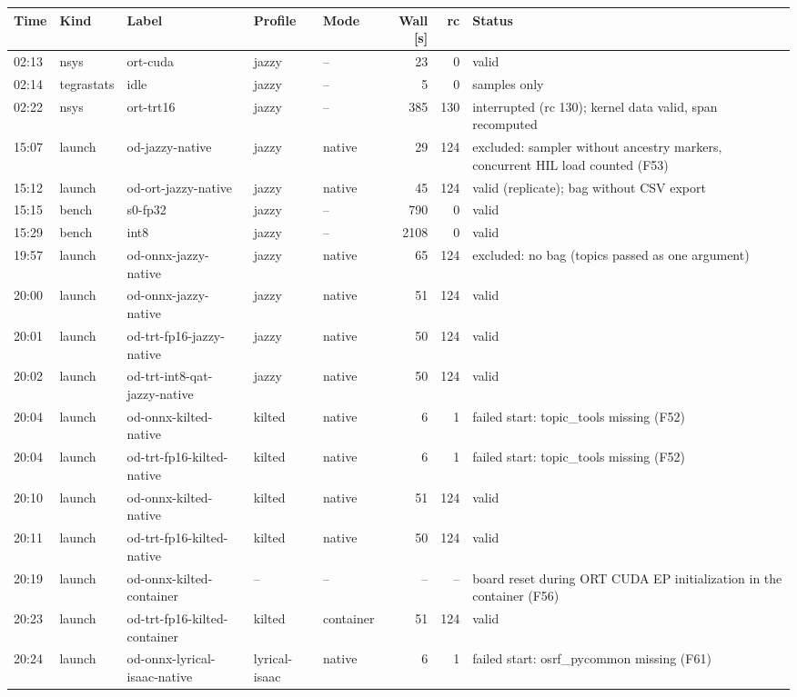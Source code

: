 \begin{longtable}{@{}ll>{\raggedright\arraybackslash}p{3.3cm}llrr>{\raggedright\arraybackslash}p{5.6cm}@{}}
\toprule
Time & Kind & Label & Profile & Mode & Wall [s] & rc & Status \\
\midrule
\endhead
02:13 & nsys & ort-cuda & jazzy & -- & 23 & 0 & valid \\
02:14 & tegrastats & idle & jazzy & -- & 5 & 0 & 3 samples only \\
02:22 & nsys & ort-trt16 & jazzy & -- & 385 & 130 & interrupted (rc 130); kernel data valid, span recomputed \\
15:07 & launch & od-jazzy-native & jazzy & native & 29 & 124 & excluded: sampler without ancestry markers, concurrent HIL load counted (F53) \\
15:12 & launch & od-ort-jazzy-native & jazzy & native & 45 & 124 & valid (replicate); bag without CSV export \\
15:15 & bench & s0-fp32 & jazzy & -- & 790 & 0 & valid \\
15:29 & bench & int8 & jazzy & -- & 2108 & 0 & valid \\
19:57 & launch & od-onnx-jazzy-native & jazzy & native & 65 & 124 & excluded: no bag (topics passed as one argument) \\
20:00 & launch & od-onnx-jazzy-native & jazzy & native & 51 & 124 & valid \\
20:01 & launch & od-trt-fp16-jazzy-native & jazzy & native & 50 & 124 & valid \\
20:02 & launch & od-trt-int8-qat-jazzy-native & jazzy & native & 50 & 124 & valid \\
20:04 & launch & od-onnx-kilted-native & kilted & native & 6 & 1 & failed start: topic\_tools missing (F52) \\
20:04 & launch & od-trt-fp16-kilted-native & kilted & native & 6 & 1 & failed start: topic\_tools missing (F52) \\
20:10 & launch & od-onnx-kilted-native & kilted & native & 51 & 124 & valid \\
20:11 & launch & od-trt-fp16-kilted-native & kilted & native & 50 & 124 & valid \\
20:19 & launch & od-onnx-kilted-container & -- & -- & -- & -- & board reset during ORT CUDA EP initialization in the container (F56) \\
20:23 & launch & od-trt-fp16-kilted-container & kilted & container & 51 & 124 & valid \\
20:24 & launch & od-onnx-lyrical-isaac-native & lyrical-isaac & native & 6 & 1 & failed start: osrf\_pycommon missing (F61) \\

\end{longtable}
